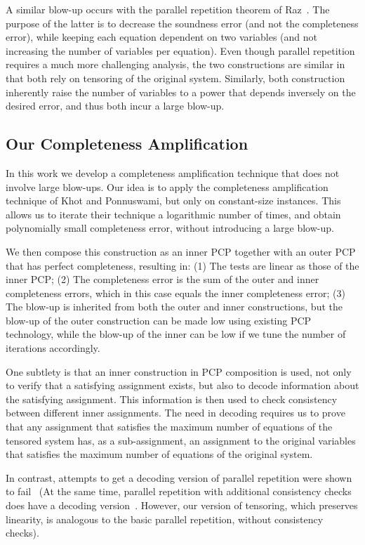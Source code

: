 A similar blow-up occurs with the parallel repetition theorem of Raz~\cite{Raz}. The purpose of the latter is to decrease the soundness error (and not the completeness error), while keeping each equation dependent on two variables (and not increasing the number of variables per equation). Even though parallel repetition requires a much more challenging analysis, the two constructions are similar in that both rely on tensoring of the original system. Similarly, both construction inherently raise the number of variables to a power that depends inversely on the desired error, and thus both incur a large blow-up.

\subsection{Our Completeness Amplification}

In this work we develop a completeness amplification technique that does not involve large blow-ups. Our idea is to apply the completeness amplification technique of Khot and Ponnuswami, but only on constant-size instances. This allows us to iterate their technique a logarithmic number of times, and obtain polynomially small completeness error, without introducing a large blow-up.

We then compose this construction as an inner PCP together with an outer PCP that has perfect completeness, resulting in: (1) The tests are linear as those of the inner PCP; (2) The completeness error is the sum of the outer and inner completeness errors, which in this case equals the inner completeness error; (3) The blow-up is inherited from both the outer and inner constructions, but the blow-up of the outer construction can be made low using existing PCP technology, while the blow-up of the inner can be low if we tune the number of iterations accordingly.

One subtlety is that an inner construction in PCP composition is used, not only to verify that a satisfying assignment exists, but also to decode information about the satisfying assignment. This information is then used to check consistency between different inner assignments.
The need in decoding requires us to prove that any assignment that satisfies the maximum number of equations of the tensored system has, as a sub-assignment, an assignment to the original variables that satisfies the maximum number of equations of the original system.

In contrast, attempts to get a decoding version of parallel repetition were shown to fail~\cite{DG10} (At the same time, parallel repetition with additional consistency checks does have a decoding version~\cite{IKW}. However, our version of tensoring, which preserves linearity, is analogous to the basic parallel repetition, without consistency checks).
